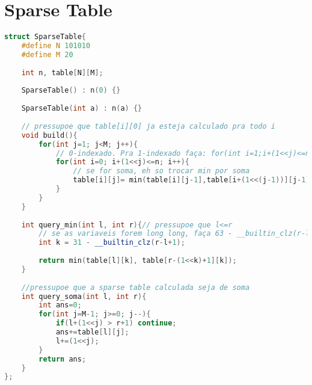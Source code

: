 \documentclass[12pt,a4paper,twoside]{report}
\begin{document}
\section{Sparse Table}
\noindent\begin{lstlisting}[caption=Sparse Table,language=C++]
struct SparseTable{
    #define N 101010
    #define M 20
     
    int n, table[N][M];
     
    SparseTable() : n(0) {}
     
    SparseTable(int a) : n(a) {}
 
    // pressupoe que table[i][0] ja esteja calculado pra todo i
    void build(){ 
        for(int j=1; j<M; j++){
            // 0-indexado. Pra 1-indexado faça: for(int i=1;i+(1<<j)<=n+1; i++)
            for(int i=0; i+(1<<j)<=n; i++){                
                // se for soma, eh so trocar min por soma
                table[i][j]= min(table[i][j-1],table[i+(1<<(j-1))][j-1]);
            }
        }
    }
     
    int query_min(int l, int r){// pressupoe que l<=r
        // se as variaveis forem long long, faça 63 - __builtin_clz(r-l+1)
        int k = 31 - __builtin_clz(r-l+1);
        
        return min(table[l][k], table[r-(1<<k)+1][k]);
    }
     
    //pressupoe que a sparse table calculada seja de soma
    int query_soma(int l, int r){    
        int ans=0;
        for(int j=M-1; j>=0; j--){
            if(l+(1<<j) > r+1) continue;
            ans+=table[l][j];
            l+=(1<<j);
        }
        return ans;
    }   
};
\end{lstlisting}
\end{document}
